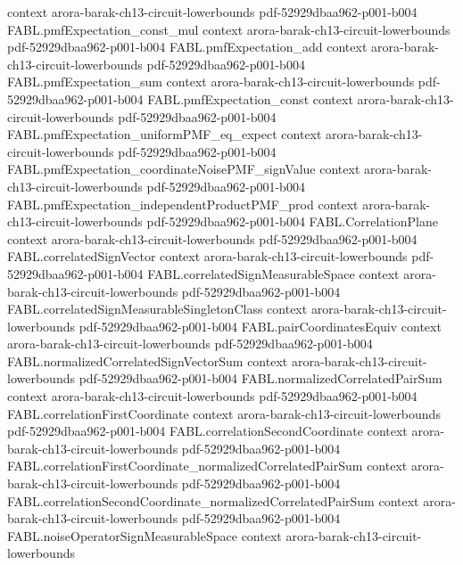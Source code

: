 \begin{theorem}
  {context}
  {arora-barak-ch13-circuit-lowerbounds}
  {pdf-52929dbaa962-p001-b004}
\proofstep
  {FABL.pmfExpectation_const_mul}
  {context}
  {arora-barak-ch13-circuit-lowerbounds}
  {pdf-52929dbaa962-p001-b004}
\proofstep
  {FABL.pmfExpectation_add}
  {context}
  {arora-barak-ch13-circuit-lowerbounds}
  {pdf-52929dbaa962-p001-b004}
\proofstep
  {FABL.pmfExpectation_sum}
  {context}
  {arora-barak-ch13-circuit-lowerbounds}
  {pdf-52929dbaa962-p001-b004}
\proofstep
  {FABL.pmfExpectation_const}
  {context}
  {arora-barak-ch13-circuit-lowerbounds}
  {pdf-52929dbaa962-p001-b004}
\proofstep
  {FABL.pmfExpectation_uniformPMF_eq_expect}
  {context}
  {arora-barak-ch13-circuit-lowerbounds}
  {pdf-52929dbaa962-p001-b004}
\proofstep
  {FABL.pmfExpectation_coordinateNoisePMF_signValue}
  {context}
  {arora-barak-ch13-circuit-lowerbounds}
  {pdf-52929dbaa962-p001-b004}
\proofstep
  {FABL.pmfExpectation_independentProductPMF_prod}
  {context}
  {arora-barak-ch13-circuit-lowerbounds}
  {pdf-52929dbaa962-p001-b004}
\proofstep
  {FABL.CorrelationPlane}
  {context}
  {arora-barak-ch13-circuit-lowerbounds}
  {pdf-52929dbaa962-p001-b004}
\proofstep
  {FABL.correlatedSignVector}
  {context}
  {arora-barak-ch13-circuit-lowerbounds}
  {pdf-52929dbaa962-p001-b004}
\proofstep
  {FABL.correlatedSignMeasurableSpace}
  {context}
  {arora-barak-ch13-circuit-lowerbounds}
  {pdf-52929dbaa962-p001-b004}
\proofstep
  {FABL.correlatedSignMeasurableSingletonClass}
  {context}
  {arora-barak-ch13-circuit-lowerbounds}
  {pdf-52929dbaa962-p001-b004}
\proofstep
  {FABL.pairCoordinatesEquiv}
  {context}
  {arora-barak-ch13-circuit-lowerbounds}
  {pdf-52929dbaa962-p001-b004}
\proofstep
  {FABL.normalizedCorrelatedSignVectorSum}
  {context}
  {arora-barak-ch13-circuit-lowerbounds}
  {pdf-52929dbaa962-p001-b004}
\proofstep
  {FABL.normalizedCorrelatedPairSum}
  {context}
  {arora-barak-ch13-circuit-lowerbounds}
  {pdf-52929dbaa962-p001-b004}
\proofstep
  {FABL.correlationFirstCoordinate}
  {context}
  {arora-barak-ch13-circuit-lowerbounds}
  {pdf-52929dbaa962-p001-b004}
\proofstep
  {FABL.correlationSecondCoordinate}
  {context}
  {arora-barak-ch13-circuit-lowerbounds}
  {pdf-52929dbaa962-p001-b004}
\proofstep
  {FABL.correlationFirstCoordinate_normalizedCorrelatedPairSum}
  {context}
  {arora-barak-ch13-circuit-lowerbounds}
  {pdf-52929dbaa962-p001-b004}
\proofstep
  {FABL.correlationSecondCoordinate_normalizedCorrelatedPairSum}
  {context}
  {arora-barak-ch13-circuit-lowerbounds}
  {pdf-52929dbaa962-p001-b004}
\proofstep
  {FABL.noiseOperatorSignMeasurableSpace}
  {context}
  {arora-barak-ch13-circuit-lowerbounds}

\end{theorem}
